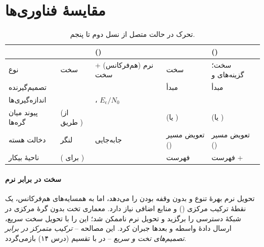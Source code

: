 \documentclass[11pt,a4paper]{article}
\begin{document}
\section{مقایسهٔ فناوری‌ها}
\begin{table}[htbp]
\centering\small
\caption{تحرک در حالت متصل از نسل دوم تا پنجم.}\label{tab:compare}
\begin{tabularx}{\linewidth}{@{}l Y Y Y Y@{}}
\toprule
{} &  &  () &  &  () \\
\midrule
نوع               & سخت                  & نرم (هم‌فرکانس) + سخت       & سخت                     & سخت؛ گزینه‌های  و  \\
تصمیم‌گیرنده      &            &                   &  مبدأ          &  مبدأ \\
اندازه‌گیری‌ها     &    & ، $E_\mathrm{c}/N_0$ &  &  \\
پیوند میان گره‌ها &  (از طریق ) &                &  (یا )     &  (یا ) \\
دخالت هسته        & لنگر       & جابه‌جایی        & تعویض مسیر () & تعویض مسیر () \\
ناحیهٔ بیکار      &  ( برای ) &  & فهرست          & فهرست  +  \\
\bottomrule
\end{tabularx}
\end{table}

\paragraph{سخت در برابر نرم} تحویل نرم بهرهٔ تنوع و بدون وقفه بودن را می‌دهد، اما به همسایه‌های
هم‌فرکانس، یک نقطهٔ ترکیب مرکزی () و منابع اضافی نیاز دارد.  معماری تخت بدون گرهٔ
مرکزی در شبکهٔ دسترسی را برگزید و تحویل نرم ناممکن شد؛ این را با تحویل سخت سریع، ارسال دادهٔ واسطه
و بعدها  جبران کرد. این مصالحه -- \emph{ترکیب متمرکز در برابر تصمیم‌های تخت و سریع} -- در
 با تقسیم  (درس ۱۴) بازمی‌گردد.

\end{document}
